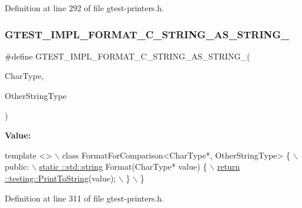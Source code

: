 Definition at line 292 of file gtest-\/printers.\+h.

\mbox{\label{gtest-printers_8h_ad6102ed2a0571d5196e606a061c16a10}} 
\subsubsection{\texorpdfstring{G\+T\+E\+S\+T\+\_\+\+I\+M\+P\+L\+\_\+\+F\+O\+R\+M\+A\+T\+\_\+\+C\+\_\+\+S\+T\+R\+I\+N\+G\+\_\+\+A\+S\+\_\+\+S\+T\+R\+I\+N\+G\+\_\+}{GTEST\_IMPL\_FORMAT\_C\_STRING\_AS\_STRING\_}}
{\footnotesize\ttfamily \#define G\+T\+E\+S\+T\+\_\+\+I\+M\+P\+L\+\_\+\+F\+O\+R\+M\+A\+T\+\_\+\+C\+\_\+\+S\+T\+R\+I\+N\+G\+\_\+\+A\+S\+\_\+\+S\+T\+R\+I\+N\+G\+\_\+(\begin{DoxyParamCaption}\item[{}]{Char\+Type,  }\item[{}]{Other\+String\+Type }\end{DoxyParamCaption})}

{\bfseries Value\+:}
\begin{DoxyCode}
\textcolor{keyword}{template} <>                                                           \(\backslash\)
  class FormatForComparison<CharType*, OtherStringType> \{               \(\backslash\)
   public:                                                              \hyperlink{namespacetesting_1_1internal_a8e8ff5b11e64078831112677156cb111}{\(\backslash\)}
\hyperlink{namespacetesting_1_1internal_a8e8ff5b11e64078831112677156cb111}{    static ::std::string} Format(CharType* value) \{                      
      \hyperlink{namespacetesting_aa5717bb1144edd1d262d310ba70c82ed}{\(\backslash\)}
\hyperlink{namespacetesting_aa5717bb1144edd1d262d310ba70c82ed}{      return ::testing::PrintToString}(value);                         
        \(\backslash\)
    \}                                                                   \(\backslash\)
  \}
\end{DoxyCode}


Definition at line 311 of file gtest-\/printers.\+h.

